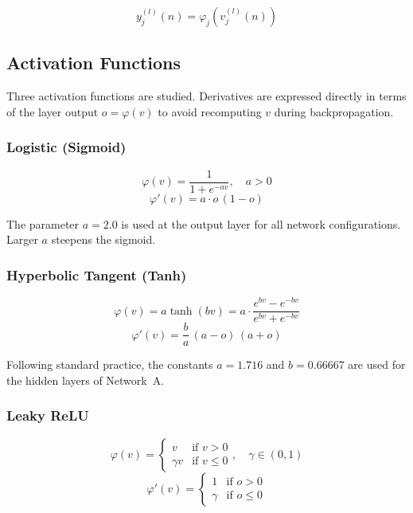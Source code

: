 \documentclass{acm_proc_article-sp}
\begin{document}
\begin{equation}
  y^{(l)}_j(n) = \varphi_j\!\left(v^{(l)}_j(n)\right)
  \label{eq:output}
\end{equation}

\subsection{Activation Functions}

Three activation functions are studied.  Derivatives are expressed
directly in terms of the layer output $o = \varphi(v)$ to avoid
recomputing $v$ during backpropagation.

\subsubsection{Logistic (Sigmoid)}

\begin{equation}
  \varphi(v) = \frac{1}{1 + e^{-av}}, \quad a > 0
  \label{eq:logistic}
\end{equation}
\begin{equation}
  \varphi'(v) = a \cdot o\,(1 - o)
\end{equation}

The parameter $a = 2.0$ is used at the output layer for all network
configurations.  Larger $a$ steepens the sigmoid.

\subsubsection{Hyperbolic Tangent (Tanh)}

\begin{equation}
  \varphi(v) = a \tanh(bv) =
  a\cdot\frac{e^{bv} - e^{-bv}}{e^{bv} + e^{-bv}}
  \label{eq:tanh}
\end{equation}
\begin{equation}
  \varphi'(v) = \frac{b}{a}\,(a - o)\,(a + o)
\end{equation}

Following standard practice, the constants
$a = 1.716$ and $b = 0.66667$ are used for the hidden layers of
Network~A.

\subsubsection{Leaky ReLU}

\begin{equation}
  \varphi(v) =
  \begin{cases}
    v         & \text{if } v > 0 \\
    \gamma v  & \text{if } v \leq 0
  \end{cases}, \quad \gamma \in (0,1)
  \label{eq:lrelu}
\end{equation}
\begin{equation}
  \varphi'(v) =
  \begin{cases}
    1       & \text{if } o > 0 \\
    \gamma  & \text{if } o \leq 0
  \end{cases}
\end{equation}
\end{document}
